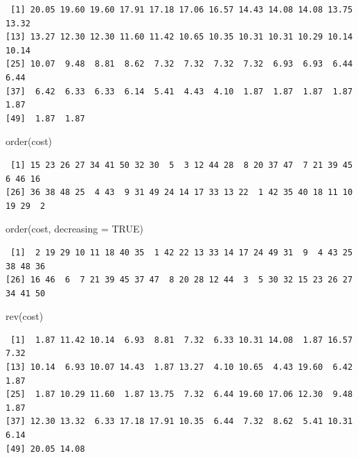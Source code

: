 \documentclass[
  letterpaper,
  DIV=11,
  numbers=noendperiod]{scrreprt}
\newenvironment{Shaded}{\begin{snugshade}}{\end{snugshade}}
\newcommand{\AttributeTok}[1]{\textcolor[rgb]{0.40,0.45,0.13}{#1}}
\newcommand{\ConstantTok}[1]{\textcolor[rgb]{0.56,0.35,0.01}{#1}}
\newcommand{\FunctionTok}[1]{\textcolor[rgb]{0.28,0.35,0.67}{#1}}
\newcommand{\NormalTok}[1]{\textcolor[rgb]{0.00,0.23,0.31}{#1}}
\begin{document}
\begin{tcolorbox}
\begin{verbatim}
 [1] 20.05 19.60 19.60 17.91 17.18 17.06 16.57 14.43 14.08 14.08 13.75 13.32
[13] 13.27 12.30 12.30 11.60 11.42 10.65 10.35 10.31 10.31 10.29 10.14 10.14
[25] 10.07  9.48  8.81  8.62  7.32  7.32  7.32  7.32  6.93  6.93  6.44  6.44
[37]  6.42  6.33  6.33  6.14  5.41  4.43  4.10  1.87  1.87  1.87  1.87  1.87
[49]  1.87  1.87
\end{verbatim}

\begin{Shaded}
\begin{Highlighting}[]
\FunctionTok{order}\NormalTok{(cost)}
\end{Highlighting}
\end{Shaded}

\begin{verbatim}
 [1] 15 23 26 27 34 41 50 32 30  5  3 12 44 28  8 20 37 47  7 21 39 45  6 46 16
[26] 36 38 48 25  4 43  9 31 49 24 14 17 33 13 22  1 42 35 40 18 11 10 19 29  2
\end{verbatim}

\begin{Shaded}
\begin{Highlighting}[]
\FunctionTok{order}\NormalTok{(cost, }\AttributeTok{decreasing =} \ConstantTok{TRUE}\NormalTok{)}
\end{Highlighting}
\end{Shaded}

\begin{verbatim}
 [1]  2 19 29 10 11 18 40 35  1 42 22 13 33 14 17 24 49 31  9  4 43 25 38 48 36
[26] 16 46  6  7 21 39 45 37 47  8 20 28 12 44  3  5 30 32 15 23 26 27 34 41 50
\end{verbatim}

\begin{Shaded}
\begin{Highlighting}[]
\FunctionTok{rev}\NormalTok{(cost)}
\end{Highlighting}
\end{Shaded}

\begin{verbatim}
 [1]  1.87 11.42 10.14  6.93  8.81  7.32  6.33 10.31 14.08  1.87 16.57  7.32
[13] 10.14  6.93 10.07 14.43  1.87 13.27  4.10 10.65  4.43 19.60  6.42  1.87
[25]  1.87 10.29 11.60  1.87 13.75  7.32  6.44 19.60 17.06 12.30  9.48  1.87
[37] 12.30 13.32  6.33 17.18 17.91 10.35  6.44  7.32  8.62  5.41 10.31  6.14
[49] 20.05 14.08
\end{verbatim}

\end{tcolorbox}
\end{document}
